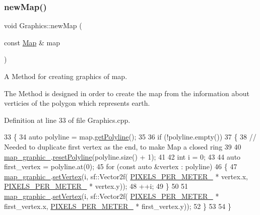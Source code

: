 \subsubsection{\texorpdfstring{new\+Map()}{newMap()}}
{\footnotesize\ttfamily void Graphics\+::new\+Map (\begin{DoxyParamCaption}\item[{const \hyperlink{classMap}{Map} \&}]{map }\end{DoxyParamCaption})}



A Method for creating graphics of map. 

The Method is designed in order to create the map from the information about verticies of the polygon which represents earth. 

Definition at line 33 of file Graphics.\+cpp.


\begin{DoxyCode}
33                                     \{
34     \textcolor{keyword}{auto} polyline = map.\hyperlink{classMap_a32d8cf8af3089a95e0471fd523050896}{getPolyline}();
35 
36     \textcolor{keywordflow}{if} (!polyline.empty())
37     \{
38         \textcolor{comment}{// Needed to duplicate first vertex as the end, to make Map a closed ring}
39 
40         \hyperlink{classGraphics_a7b3e98774ea965783584d5351c730276}{map\_graphic\_}.\hyperlink{classMapGraphics_a389137596a79ed6a8239fe5451f8f470}{resetPolyline}(polyline.size() + 1);
41 
42         \textcolor{keywordtype}{int} i = 0;
43 
44         \textcolor{keyword}{auto} first\_vertex = polyline.at(0);
45         \textcolor{keywordflow}{for} (\textcolor{keyword}{const} \textcolor{keyword}{auto} &vertex : polyline)
46         \{
47             \hyperlink{classGraphics_a7b3e98774ea965783584d5351c730276}{map\_graphic\_}.\hyperlink{classMapGraphics_a0d58d85db2e9d6e62623ebab6ffa11e9}{setVertex}(i, sf::Vector2f(
      \hyperlink{classGraphics_af9c6251065c2900d0a92380c2bea26b2}{PIXELS\_PER\_METER\_} * vertex.x, \hyperlink{classGraphics_af9c6251065c2900d0a92380c2bea26b2}{PIXELS\_PER\_METER\_} * vertex.y));
48             ++i;
49         \}
50 
51         \hyperlink{classGraphics_a7b3e98774ea965783584d5351c730276}{map\_graphic\_}.\hyperlink{classMapGraphics_a0d58d85db2e9d6e62623ebab6ffa11e9}{setVertex}(i, sf::Vector2f(
      \hyperlink{classGraphics_af9c6251065c2900d0a92380c2bea26b2}{PIXELS\_PER\_METER\_} * first\_vertex.x, \hyperlink{classGraphics_af9c6251065c2900d0a92380c2bea26b2}{PIXELS\_PER\_METER\_} * first\_vertex.y));
52     \}
53 
54 \}
\end{DoxyCode}
\mbox{\label{classGraphics_abaf6bc20f9541026835dfee157ac5efb}} 

